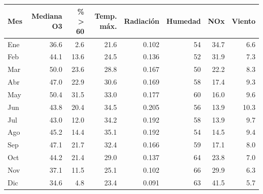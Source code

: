 
\begin{tabular}{lrrrrrrr}
\toprule
Mes & Mediana O3 & \% > 60 & Temp. máx. & Radiación & Humedad & NOx & Viento\\
\midrule
Ene & 36.6 & 2.6 & 21.6 & 0.102 & 54 & 34.7 & 6.6\\
Feb & 44.1 & 13.6 & 24.5 & 0.136 & 52 & 31.9 & 7.3\\
Mar & 50.0 & 23.6 & 28.8 & 0.167 & 50 & 22.2 & 8.3\\
Abr & 47.0 & 22.9 & 30.6 & 0.169 & 58 & 17.4 & 9.3\\
May & 50.4 & 31.5 & 33.0 & 0.177 & 60 & 16.0 & 9.6\\
Jun & 43.8 & 20.4 & 34.5 & 0.205 & 56 & 13.9 & 10.3\\
Jul & 43.0 & 12.0 & 34.2 & 0.192 & 58 & 13.9 & 9.7\\
Ago & 45.2 & 14.4 & 35.1 & 0.192 & 54 & 14.5 & 9.4\\
Sep & 47.1 & 21.7 & 32.4 & 0.166 & 59 & 17.1 & 8.0\\
Oct & 44.2 & 21.4 & 29.0 & 0.137 & 64 & 23.8 & 7.0\\
Nov & 37.1 & 11.5 & 25.1 & 0.102 & 66 & 29.9 & 6.3\\
Dic & 34.6 & 4.8 & 23.4 & 0.091 & 63 & 41.5 & 5.7\\
\bottomrule
\end{tabular}
